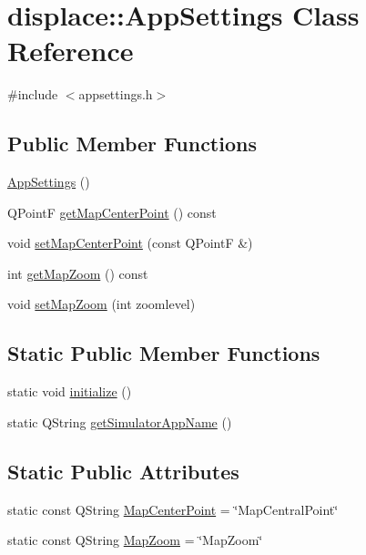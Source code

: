 \hypertarget{classdisplace_1_1_app_settings}{}\section{displace\+::App\+Settings Class Reference}
\label{classdisplace_1_1_app_settings}


{\ttfamily \#include $<$appsettings.\+h$>$}

\subsection*{Public Member Functions}
\begin{DoxyCompactItemize}
\item 
\mbox{\hyperlink{classdisplace_1_1_app_settings_ac327d0a43da29c01585c7a256b49b31a}{App\+Settings}} ()
\item 
Q\+PointF \mbox{\hyperlink{classdisplace_1_1_app_settings_aef7de5d290955bdf5a52a1136bdf35b8}{get\+Map\+Center\+Point}} () const
\item 
void \mbox{\hyperlink{classdisplace_1_1_app_settings_a7c56b92f63437ed3e43546a150f66861}{set\+Map\+Center\+Point}} (const Q\+PointF \&)
\item 
int \mbox{\hyperlink{classdisplace_1_1_app_settings_a8ee99f788691cf16b586548d3918a1b0}{get\+Map\+Zoom}} () const
\item 
void \mbox{\hyperlink{classdisplace_1_1_app_settings_a0928ad2294eac0f34ae5130b1e9c75e2}{set\+Map\+Zoom}} (int zoomlevel)
\end{DoxyCompactItemize}
\subsection*{Static Public Member Functions}
\begin{DoxyCompactItemize}
\item 
static void \mbox{\hyperlink{classdisplace_1_1_app_settings_aac6807bc7651eac782ed4e7070b33286}{initialize}} ()
\item 
static Q\+String \mbox{\hyperlink{classdisplace_1_1_app_settings_a6332cd8ad753f369d38b7eae6b429dc0}{get\+Simulator\+App\+Name}} ()
\end{DoxyCompactItemize}
\subsection*{Static Public Attributes}
\begin{DoxyCompactItemize}
\item 
static const Q\+String \mbox{\hyperlink{classdisplace_1_1_app_settings_a8d051344fd2190972d2cecfc82eb8460}{Map\+Center\+Point}} = \char`\"{}Map\+Central\+Point\char`\"{}
\item 
static const Q\+String \mbox{\hyperlink{classdisplace_1_1_app_settings_a59de52c5f6612dbc450ccf65f2db88f8}{Map\+Zoom}} = \char`\"{}Map\+Zoom\char`\"{}
\end{DoxyCompactItemize}


